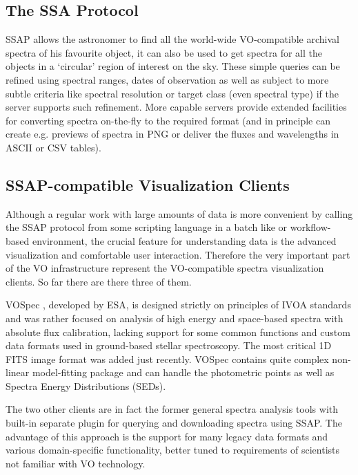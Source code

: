 \documentclass[final,authoryear,5p,times,twocolumn]{elsarticle}
\begin{document}
  \subsection{The SSA Protocol}
%
SSAP allows the astronomer to find all the world-wide VO-compatible archival
spectra of his favourite object, it can also be used to get spectra for all
the objects in a `circular' region of interest on the sky. These simple
queries can be refined using spectral ranges, dates of observation as well as
subject to more subtle criteria like spectral resolution or target class (even
spectral type) if the server supports such refinement. More capable servers
provide extended facilities for converting spectra on-the-fly to the required
format (and in principle can create e.g. previews of spectra in PNG or deliver
the fluxes and wavelengths in ASCII or CSV tables).

\subsection{SSAP-compatible  Visualization Clients}
%
Although a regular work with large amounts of data is more convenient by
calling the SSAP protocol from some scripting language in a batch like or
workflow-based environment, the crucial feature for understanding data is the
advanced visualization and comfortable user interaction.  Therefore the very
important part of the VO infrastructure represent the VO-compatible spectra
visualization clients.  So far there are there three of them.

VOSpec \citep[][]{2005ASPC..347..198O}, developed by ESA, is
designed strictly on principles of IVOA standards and was rather focused on
analysis of high energy and space-based spectra with absolute flux
calibration, lacking support for some common functions and custom data formats
used in ground-based stellar spectroscopy. The most critical 1D FITS image
format was added just recently. VOSpec contains quite complex non-linear
model-fitting package and can handle the photometric points as well as Spectra
Energy Distributions (SEDs).

The two other clients are in fact the former general spectra analysis tools
with built-in separate plugin for querying and downloading spectra using SSAP.
The advantage of this approach is the support for many legacy data formats and
various domain-specific functionality, better tuned to requirements of
scientists not familiar with VO technology.
\end{document}

